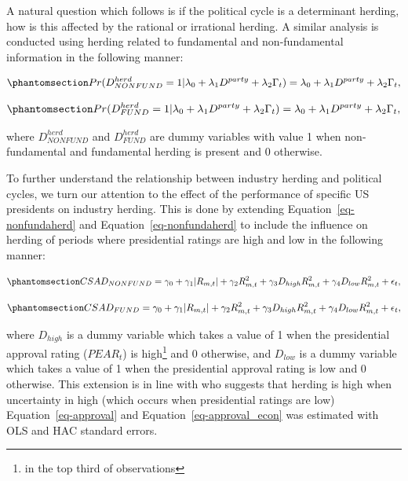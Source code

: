 \documentclass[
  letterpaper,
  DIV=11,
  numbers=noendperiod]{scrartcl}
\begin{document}
A natural question which follows is if the political cycle is a
determinant herding, how is this affected by the rational or irrational
herding. A similar analysis is conducted using herding related to
fundamental and non-fundamental information in the following manner:

\begin{equation}\phantomsection\label{eq-politicalnonfund}{
Pr(D^{herd}_{NONFUND} = 1 |\lambda_0 +  \lambda_1D^{party}  + \lambda_2\Gamma_t) = \lambda_0 +  \lambda_1D^{party}  + \lambda_2\Gamma_t,
}\end{equation}

\begin{equation}\phantomsection\label{eq-politicalfund}{
Pr(D^{herd}_{FUND}= 1 |\lambda_0 +  \lambda_1D^{party}  + \lambda_2\Gamma_t) = \lambda_0 +  \lambda_1D^{party}  + \lambda_2\Gamma_t,
}\end{equation}

where \(D^{herd}_{NONFUND}\) and \(D^{herd}_{FUND}\) are dummy variables
with value 1 when non-fundamental and fundamental herding is present and
0 otherwise.

To further understand the relationship between industry herding and
political cycles, we turn our attention to the effect of the performance
of specific US presidents on industry herding. This is done by extending
Equation~\ref{eq-nonfundaherd} and Equation~\ref{eq-nonfundaherd} to
include the influence on herding of periods where presidential ratings
are high and low in the following manner:

\begin{equation}\phantomsection\label{eq-approval}{
CSAD_{NONFUND} = \gamma_0 + \gamma_1|R_{m,t}| + \gamma_2R_{m, t}^2 + \gamma_3D_{high}R_{m,t}^2 + \gamma_4D_{low}R_{m,t}^2 + \epsilon_{t}, 
}\end{equation}

\begin{equation}\phantomsection\label{eq-approval_econ}{
CSAD_{FUND} = \gamma_0 + \gamma_1|R_{m,t}| + \gamma_2R_{m, t}^2 + \gamma_3D_{high}R_{m,t}^2 + \gamma_4D_{low}R_{m,t}^2 + \epsilon_{t}, 
}\end{equation}

where \(D_{high}\) is a dummy variable which takes a value of 1 when the
presidential approval rating (\(PEAR_t\)) is high\footnote{in the top
  third of observations} and 0 otherwise, and \(D_{low}\) is a dummy
variable which takes a value of 1 when the presidential approval rating
is low and 0 otherwise. This extension is in line with
\citet{pastor2020political} who suggests that herding is high when
uncertainty in high (which occurs when presidential ratings are low)
Equation~\ref{eq-approval} and Equation~\ref{eq-approval_econ} was
estimated with OLS and HAC standard errors.
\end{document}
